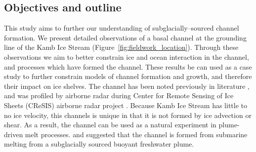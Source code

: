 \subsection{Objectives and outline}

This study aims to further our understanding of subglacially--sourced channel formation. We present detailed observations of a basal channel at the grounding line of the Kamb Ice Stream (Figure~\ref{fig:fieldwork_location}).  Through these observations we aim to better constrain ice and ocean interaction in the channel, and processes which have formed the channel. These results be can used as a case study to further constrain models of channel formation and growth, and therefore their impact on ice shelves. The channel has been noted previously in literature \citep{alley2016impacts,kim2016active,goeller2015subglacial,horgan2017poststagnation}, and was profiled by airborne radar during Center for Remote Sensing of Ice Sheets (CReSIS) airborne radar project \citep{arnold2020cresis}. Because Kamb Ice Stream has little to no ice velocity, this channels is unique in that it is not formed by ice advection or shear. As a result, the channel can be used as a natural experiment in plume-driven melt processes. \cite{kim2016active} and \cite{alley2016impacts} suggested that the channel is formed from submarine melting from a subglacially sourced buoyant freshwater plume.  

